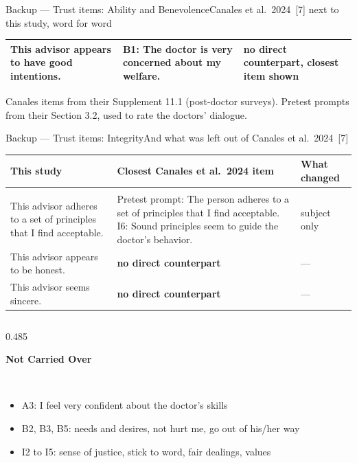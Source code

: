 \documentclass[aspectratio=169,10pt]{beamer}
\newcommand{\bad}[1]{{\color{knred}\textbf{#1}}}
\newcommand{\panelhead}[1]{\noindent\colorbox{kncyan}{\parbox{0.96\textwidth}{\centering\vspace{1pt}\color{white}\scriptsize\bfseries #1\vspace{1pt}}}\\[0.25em]}
\newcommand{\panel}[1]{\noindent\colorbox{knlight}{\parbox{0.96\textwidth}{\vspace{2pt}\scriptsize
\begin{itemize}\setlength{\itemsep}{0.2em}\setlength{\leftmargini}{1.1em}#1\end{itemize}\vspace{2pt}}}}
\begin{document}
\begin{frame}{Backup — Trust items: Ability and Benevolence}{Canales et al.\ 2024~[7] next to this study, word for word}
{\begin{tabular}{@{}>{\raggedright\arraybackslash}m{}>{\raggedright\arraybackslash}m{}>{\raggedright\arraybackslash}m{}@{}}
    This advisor appears to have good intentions. & B1: The doctor is very concerned about my welfare. & \bad{no direct counterpart}, closest item shown \\
    \bottomrule
  \end{tabular}\par}
  \vspace{0.3em}
  {\tiny\color{kngrey}Canales items from their Supplement 11.1 (post-doctor surveys). Pretest prompts from their Section 3.2, used to rate the doctors' dialogue.\par}
\end{frame}

\begin{frame}{Backup — Trust items: Integrity}{And what was left out of Canales et al.\ 2024~[7]}
  \vspace{0.1em}
  {\tiny
  \setlength{\tabcolsep}{4pt}\renewcommand{\arraystretch}{1.35}
  \begin{tabular}{@{}>{\raggedright\arraybackslash}m{}>{\raggedright\arraybackslash}m{}>{\raggedright\arraybackslash}m{}@{}}
    \toprule
    \textbf{This study} & \textbf{Closest Canales et al.\ 2024 item} & \textbf{What changed} \\
    \midrule
    \multicolumn{3}{@{}l}{\textbf{\color{knblue}Integrity}} \\
    This advisor adheres to a set of principles that I find acceptable. & Pretest prompt: The person adheres to a set of principles that I find acceptable. \newline I6: Sound principles seem to guide the doctor's behavior. & subject only \\
    This advisor appears to be honest. & \bad{no direct counterpart} & --- \\
    This advisor seems sincere. & \bad{no direct counterpart} & --- \\
    \bottomrule
  \end{tabular}\par}
  \vspace{0.6em}
  \begin{columns}[T,onlytextwidth]
    \begin{column}{0.485\textwidth}
      \panelhead{Not Carried Over}
      \panel{%
        \item A3: I feel very confident about the doctor's skills
        \item B2, B3, B5: needs and desires, not hurt me, go out of his/her way
        \item I2 to I5: sense of justice, stick to word, fair dealings, values
}
\end{column}
\end{columns}
\end{frame}
\end{document}
